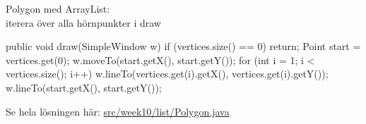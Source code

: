 \documentclass{lecturenotes}
\begin{document}
\begin{Slide}{Polygon med ArrayList: \\iterera över alla hörnpunkter i draw}
\begin{Code}[numberstyle=]
    public void draw(SimpleWindow w) {
        if (vertices.size() == 0) {
            return;
        }
        Point start = vertices.get(0);
        w.moveTo(start.getX(), start.getY());
        for (int i = 1; i < vertices.size(); i++) {
            w.lineTo(vertices.get(i).getX(), 
                     vertices.get(i).getY());
        }
        w.lineTo(start.getX(), start.getY());
    }
\end{Code}

Se hela lösningen här:
\href{https://github.com/bjornregnell/lth-eda016-2015/blob/master/lectures/examples/eclipse-ws/lecture-examples/src/week10/list/Polygon.java}{src/week10/list/Polygon.java}
\end{Slide}
\end{document}
